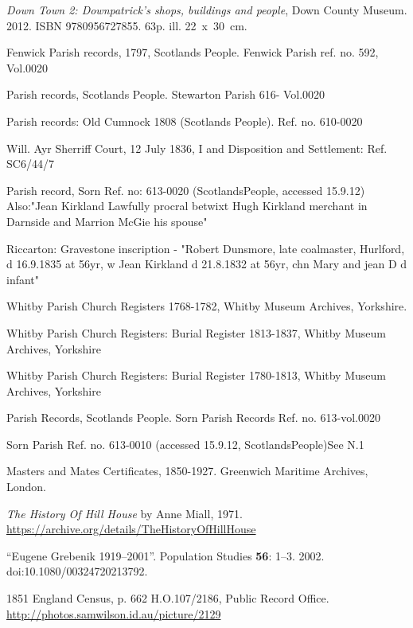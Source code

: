 \begin{thebibliography}{99}
	\emph{Down Town 2: Downpatrick's shops, buildings and people}, Down County Museum.
	2012. ISBN 9780956727855. 63p. ill. 22~x~30~cm.

	Fenwick Parish records, 1797, Scotlands People. Fenwick Parish ref. no. 592, Vol.0020

	Parish records, Scotlands People. Stewarton Parish 616- Vol.0020
	
	Parish records: Old Cumnock 1808 (Scotlands People). Ref. no. 610-0020
	
	 Will. Ayr Sherriff Court, 12 July 1836, I and Disposition and Settlement: Ref. SC6/44/7
	 
	Parish record, Sorn Ref. no: 613-0020 (ScotlandsPeople, accessed 15.9.12)
	Also:"Jean Kirkland Lawfully procral betwixt Hugh Kirkland merchant in Darnside and Marrion McGie his 			spouse"
	
	Riccarton: Gravestone inscription - "Robert Dunsmore, late coalmaster, Hurlford, d 16.9.1835 at 56yr,
	w Jean Kirkland d 21.8.1832 at 56yr, chn Mary and jean D d infant"

	Whitby Parish Church Registers 1768-1782, Whitby Museum Archives, Yorkshire.

	Whitby Parish Church Registers: Burial Register 1813-1837, Whitby Museum Archives, Yorkshire

	Whitby Parish Church Registers: Burial Register 1780-1813, Whitby Museum Archives, Yorkshire

	Parish Records, Scotlands People. Sorn Parish Records Ref. no. 613-vol.0020

	Sorn Parish Ref. no. 613-0010 (accessed 15.9.12, ScotlandsPeople)See N.1

	Masters and Mates Certificates, 1850-1927. Greenwich Maritime Archives, London.

	\emph{The History Of Hill House} by Anne Miall, 1971.
	\url{https://archive.org/details/TheHistoryOfHillHouse}

``Eugene Grebenik 1919--2001''. Population Studies \textbf{56}: 1--3. 2002. doi:10.1080/00324720213792.

	1851 England Census, p. 662 H.O.107/2186, Public Record Office.
	\url{http://photos.samwilson.id.au/picture/2129}


\end{thebibliography}
